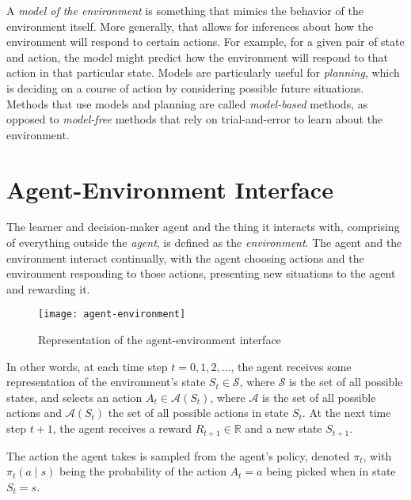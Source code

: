 A \textit{model of the environment} is something that mimics the behavior of the environment itself. More generally, that allows for inferences about how the environment will respond to certain actions. For example, for a given pair of state and action, the model might predict how the environment will respond to that action in that particular state. Models are particularly useful for \textit{planning}, which is deciding on a course of action by considering possible future situations. Methods that use models and planning are called \textit{model-based} methods, as opposed to \textit{model-free} methods that rely on trial-and-error to learn about the environment.

\section{Agent-Environment Interface}
The learner and decision-maker agent and the thing it interacts with, comprising of everything outside the \textit{agent}, is defined as the \textit{environment}. The agent and the environment interact continually, with the agent choosing actions and the environment responding to those actions, presenting new situations to the agent and rewarding it.

\begin{figure}[H]
    \texttt{[image: agent-environment]}
    \caption{Representation of the agent-environment interface}
\end{figure}

In other words, at each time step $t = 0, 1, 2, \dots$, the agent receives some representation of the environment's state $S_t \in \mathcal{S}$, where $\mathcal{S}$ is the set of all possible states, and selects an action $A_t \in \mathcal{A}(S_t)$, where $\mathcal{A}$ is the set of all possible actions and $\mathcal{A}(S_t)$ the set of all possible actions in state $S_t$. At the next time step $t+1$, the agent receives a reward $R_{t+1} \in \mathbb{R}$ and a new state $S_{t+1}$. 

The action the agent takes is sampled from the agent's policy, denoted $\pi_t$, with $\pi_t(a \mid s)$ being the probability of the action $A_t = a$ being picked when in state $S_t = s$.

\section{}